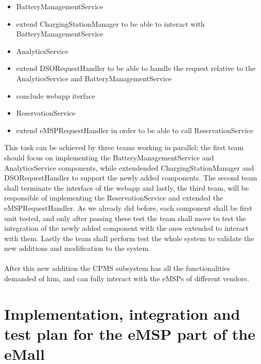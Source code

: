 \begin{itemize}
    \item BatteryManagementService
    \item extend ChargingStationManager to be able to interact with BatteryManagementService
    \item AnalyticsService
    \item extend DSORequestHandler to be able to handle the request relative to the AnalyticsService and BatteryManagementService
    \item conclude webapp iterface
    \item ReservationService
    \item extend eMSPRequestHandler in order to be able to call ReservationService
\end{itemize}
This task can be achieved by three teams working in parallel; the first team should focus on implementing the BatteryManagementService and AnalyticsService components, while extendended ChargingStationManager and DSORequestHandler to support the newly added components. The second team shall terminate the interface of the webapp and lastly, the third team, will be responsible of implementing the ReservationService and extended the eMSPRequestHandler. As we already did before, each component shall be first unit tested, and only after passing these test the team shall move to test the integration of the newly added component with the ones extended to interact with them. Lastly the team shall perform test the whole system to validate the new additions and modification to the system.\\
\\
After this new addition the CPMS subsystem has all the functionalities demanded of him, and can fully interact with the eMSPs of different vendors.

\section{Implementation, integration and test plan for the eMSP part of the eMall}
